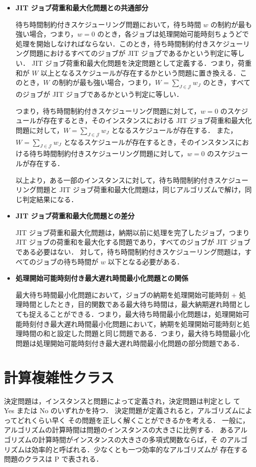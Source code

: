 \documentclass[12pt]{optlab-bachelor}
\begin{document}
\begin{itemize}
  \item \textbf{JIT ジョブ荷重和最大化問題との共通部分}

待ち時間制約付きスケジューリング問題において，待ち時間 $w$ の制約が最も強い場合，つまり，$w = 0$ のとき，各ジョブは処理開始可能時刻ちょうどで処理を開始しなければならない．このとき，待ち時間制約付きスケジューリング問題におけるすべてのジョブが JIT ジョブであるかという判定に等しい．
  JIT ジョブ荷重和最大化問題を決定問題として定義する．つまり，荷重和が $W$ 以上となるスケジュールが存在するかという問題に置き換える．このとき，$W$ の制約が最も強い場合，つまり，$W = {\displaystyle \sum_{J \in \mathcal{J}}w_J}$ のとき，すべてのジョブが JIT  ジョブであるかという判定に等しい．

  つまり，待ち時間制約付きスケジューリング問題に対して，$w = 0$ のスケジュールが存在するとき，そのインスタンスにおける JIT ジョブ荷重和最大化問題に対して，$W = {\displaystyle \sum_{J \in \mathcal{J}}w_J}$ となるスケジュールが存在する．
  また，$W = {\displaystyle \sum_{J \in \mathcal{J}}w_J}$ となるスケジュールが存在するとき，そのインスタンスにおける待ち時間制約付きスケジューリング問題に対して，$w = 0$ のスケジュールが存在する．

  以上より，ある一部のインスタンスに対して，待ち時間制約付きスケジューリング問題と JIT ジョブ荷重和最大化問題は，同じアルゴリズムで解け，同じ判定結果になる．

  \item \textbf{JIT ジョブ荷重和最大化問題との差分}

  JIT ジョブ荷重和最大化問題は，納期以前に処理を完了したジョブ，つまり JIT ジョブの荷重和を最大化する問題であり，すべてのジョブが JIT ジョブである必要はない．
  対して，待ち時間制約付きスケジューリング問題は，すべてのジョブの待ち時間が $w$ 以下となる必要がある．

  \item \textbf{処理開始可能時刻付き最大遅れ時間最小化問題との関係}

  最大待ち時間最小化問題において，ジョブの納期を処理開始可能時刻 + 処理時間としたとき，目的関数である最大待ち時間は，最大納期遅れ時間としても捉えることができる．つまり，最大待ち時間最小化問題は，処理開始可能時刻付き最大遅れ時間最小化問題において，納期を処理開始可能時刻と処理時間の和と設定した問題と同じ問題である．つまり，最大待ち時間最小化問題は処理開始可能時刻付き最大遅れ時間最小化問題の部分問題である．
\end{itemize}

\section{計算複雑性クラス}
決定問題は，インスタンスと問題によって定義され，決定問題は判定とし
て Yes または No のいずれかを持つ．
決定問題が定義されると，アルゴリズムによってどれくらい早く
その問題を正しく解くことができるかを考える．
一般に，アルゴリズムの計算時間は問題のインスタンスの大きさに比例する．
あるアルゴリズムの計算時間がインスタンスの大きさの多項式関数ならば，そ
のアルゴリズムは効率的と呼ばれる．少なくとも一つ効率的なアルゴリズムが
存在する問題のクラスは P で表される．
\end{document}
